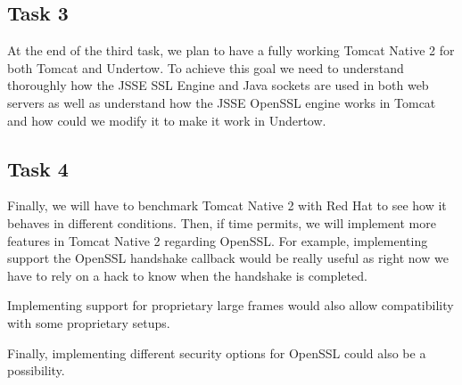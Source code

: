 \documentclass[11pt,a4paper,bibliography=totocnumbered]{scrartcl}
\def\mytitle{Tomcat Native 2}
\begin{document}
\subsection{Task 3}
\label{subsec:task3}

At the end of the third task, we plan to have a fully working \mytitle{} for both Tomcat and Undertow. To achieve this goal we need to understand thoroughly how the JSSE SSL Engine and Java sockets are used in both web servers as well as understand how the JSSE OpenSSL engine works in Tomcat and how could we modify it to make it work in Undertow.

\subsection{Task 4}
\label{subsec:task4}

Finally, we will have to benchmark \mytitle{} with Red Hat to see how it behaves in different conditions. Then, if time permits, we will implement more features in \mytitle{} regarding OpenSSL. For example, implementing support the OpenSSL handshake callback would be really useful as right now we have to rely on a hack to know when the handshake is completed.

Implementing support for proprietary large frames would also allow compatibility with some proprietary setups.

Finally, implementing different security options for OpenSSL could also be a possibility.
\newpage
\printbibliography
\end{document}
